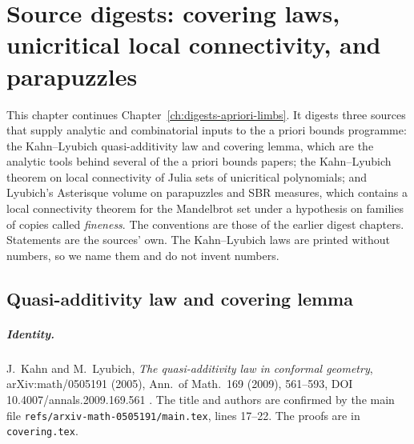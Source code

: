 \chapter[Covering laws and parapuzzles]{Source digests: covering laws, unicritical local connectivity, and parapuzzles}
\label{ch:digests-covering-parapuzzle}

This chapter continues Chapter~\ref{ch:digests-apriori-limbs}.  It digests three sources that
supply analytic and combinatorial inputs to the a priori bounds programme: the Kahn--Lyubich
quasi-additivity law and covering lemma, which are the analytic tools behind several of the
a priori bounds papers; the Kahn--Lyubich theorem on local connectivity of Julia sets of
unicritical polynomials; and Lyubich's Asterisque volume on parapuzzles and SBR measures, which
contains a local connectivity theorem for the Mandelbrot set under a hypothesis on families of
copies called \emph{fineness}.  The conventions are those of the earlier digest chapters.
Statements are the sources' own.  The Kahn--Lyubich laws are printed without numbers, so we
name them and do not invent numbers.

\section{Quasi-additivity law and covering lemma}
\label{sec:kl-qa}

\paragraph{Identity.}
J.~Kahn and M.~Lyubich, \emph{The quasi-additivity law in conformal geometry},
arXiv:math/0505191 (2005), Ann.\ of Math.\ 169 (2009), 561--593, DOI
10.4007/annals.2009.169.561 \cite{KahnLyubichQA}.  The title and authors are confirmed by the main
file \texttt{refs/arxiv-math-0505191/main.tex}, lines 17--22.  The proofs are in
\texttt{covering.tex}.

